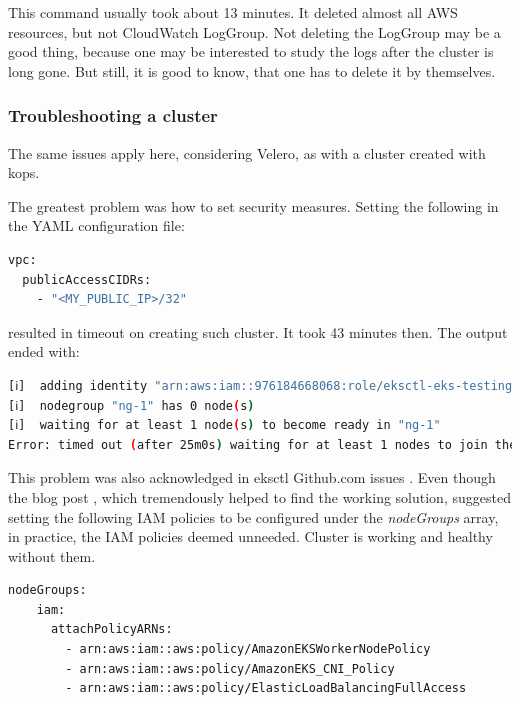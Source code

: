 This command usually took about 13 minutes. It deleted almost all AWS resources, but not CloudWatch LogGroup. Not deleting the LogGroup may be a good thing, because one may be interested to study the logs after the cluster is long gone. But still, it is good to know, that one has to delete it by themselves.

\subsubsection{Troubleshooting a cluster}
\label{eks-troubleshooting}

The same issues apply here, considering Velero, as with a cluster created with kops.


The greatest problem was how to set security measures. Setting the following in the YAML configuration file:
\begin{lstlisting}[basicstyle=\tiny,caption={Attempt to setup security},captionpos=b,language=Bash,xleftmargin=1cm]
vpc:
  publicAccessCIDRs:
    - "<MY_PUBLIC_IP>/32"
\end{lstlisting}
resulted in timeout on creating such cluster. It took 43 minutes then. The output ended with:

\begin{lstlisting}[basicstyle=\tiny,caption={Error output from creating eksctl cluster},captionpos=b,language=Bash,xleftmargin=1cm]
[ℹ]  adding identity "arn:aws:iam::976184668068:role/eksctl-eks-testing-nodegroup-ng-1-NodeInstanceRole-8VB5IDO1Z4KQ" to auth ConfigMap
[ℹ]  nodegroup "ng-1" has 0 node(s)
[ℹ]  waiting for at least 1 node(s) to become ready in "ng-1"
Error: timed out (after 25m0s) waiting for at least 1 nodes to join the cluster and become ready in "ng-1"
\end{lstlisting}
This problem was also acknowledged in eksctl Github.com issues \cite{eksctl-net-issue1,eksctl-net-issue2}. Even though the blog post \cite{eksctl-net-issue-solution}, which tremendously helped to find the working solution, suggested setting the following IAM policies to be configured under the \textit{nodeGroups} array, in practice, the IAM policies deemed unneeded. Cluster is working and healthy without them.
\begin{lstlisting}[basicstyle=\tiny,caption={IAM policies recommended for eksctl by a blog post},captionpos=b,language=Bash,xleftmargin=1cm]
nodeGroups:
    iam:
      attachPolicyARNs:
        - arn:aws:iam::aws:policy/AmazonEKSWorkerNodePolicy
        - arn:aws:iam::aws:policy/AmazonEKS_CNI_Policy
        - arn:aws:iam::aws:policy/ElasticLoadBalancingFullAccess
\end{lstlisting}

